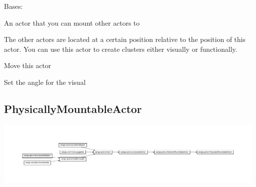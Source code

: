 \documentclass[letterpaper,10pt,english]{sphinxmanual}
\begin{document}
\begin{fulllineitems}
\label{actor:serge.actor.MountableActor}
Bases: 

An actor that you can mount other actors to

The other actors are located at a certain position
relative to the position of this actor. You can
use this actor to create clusters either visually
or functionally.

\begin{fulllineitems}
\label{actor:serge.actor.MountableActor.moveTo}
Move this actor

\end{fulllineitems}


\begin{fulllineitems}
\label{actor:serge.actor.MountableActor.setAngle}
Set the angle for the visual

\end{fulllineitems}


\end{fulllineitems}



\subsection{PhysicallyMountableActor}
\label{actor:physicallymountableactor}
\includegraphics{inheritance-215be21f1f2a46f6eb668bf702c8a1a7040e871b.pdf}
\end{document}
